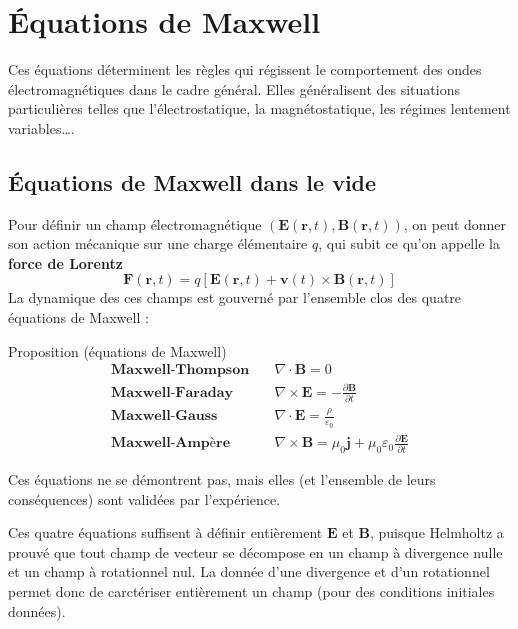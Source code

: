 \section{Équations de Maxwell}

    Ces équations déterminent les règles qui régissent le comportement des ondes électromagnétiques dans le cadre général. Elles généralisent des situations particulières telles que l’électrostatique, la magnétostatique, les régimes lentement variables\ldots. 
    
    \subsection{Équations de Maxwell dans le vide}


        Pour définir un champ électromagnétique $(\mathbf{E}(\mathbf{r},t), \mathbf{B}(\mathbf{r},t))$, on peut donner son action mécanique sur une charge élémentaire $q$, qui subit ce qu’on appelle la \textbf{force de Lorentz} 
        \[ \mathbf{F}(\mathbf{r},t) = q\left[\mathbf{E}(\mathbf{r},t) + \mathbf{v}(t) \times \mathbf{B}(\mathbf{r},t)\right] \]    
        La dynamique des ces champs est gouverné par l’ensemble clos des quatre équations de Maxwell :
        \begin{omed}{Proposition (équations de Maxwell)}
            \begin{align*}
                \textbf{Maxwell-Thompson} \quad &\nabla \cdot \mathbf{B} = 0 \\
                \textbf{Maxwell-Faraday} \quad &\nabla \times \mathbf{E} = -\frac{\partial \mathbf{B}}{\partial t} \\
                \textbf{Maxwell-Gauss} \quad  &\nabla \cdot \mathbf{E} = \frac{\rho}{\varepsilon_{0}} \\
                \textbf{Maxwell-Ampère} \quad &\nabla \times \mathbf{B} = \mu_0 \mathbf{j} + \mu_0 \varepsilon_0 \frac{\partial \mathbf{E}}{\partial t} 
            \end{align*}
        \end{omed}
        Ces équations ne se démontrent pas, mais elles (et l’ensemble de leurs conséquences) sont validées par l’expérience. 
        
        Ces quatre équations suffisent à définir entièrement $\mathbf{E}$ et $\mathbf{B}$, puisque Helmholtz a prouvé que tout champ de vecteur se décompose en un champ à divergence nulle et un champ à rotationnel nul. La donnée d’une divergence et d’un rotationnel permet donc de carctériser entièrement un champ (pour des conditions initiales données).

